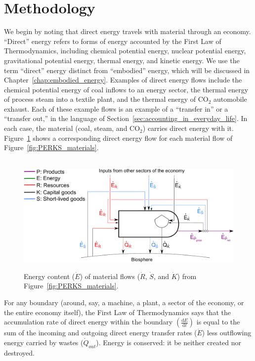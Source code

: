 \section{Methodology}
\label{sec:energy_methodology}

We begin by noting that direct energy travels 
with material through an economy.
``Direct'' energy refers to forms of energy accounted by the 
First Law of Thermodynamics,
including chemical potential energy, 
nuclear potential energy, 
gravitational potential energy,
thermal energy, 
and kinetic energy.
We use the term ``direct'' energy distinct from ``embodied'' energy, 
which will be discussed in Chapter~\ref{chap:embodied_energy}.
Examples of direct energy flows include 
the chemical potential energy of coal inflows to an energy sector, 
the thermal energy of process steam into a textile plant, and
the thermal energy of CO$_2$ automobile exhaust.
Each of these example flows is an example of a ``transfer in''
or a ``transfer out,'' in the language %
of Section~\ref{sec:accounting_in_everyday_life}.
In each case, the material (coal, steam, and CO$_2$) 
carries direct energy with it.
Figure~\ref{fig:PERKS_energy_content} shows a corresponding 
direct energy flow for each material flow of Figure~\ref{fig:PERKS_materials}.

\begin{figure}[!ht]
\centering\
\includegraphics[width=0.8\linewidth]{Part_1/Chapter_Energy/images/PERKS_basic_unit_energy_content.pdf}
\caption[Energy content of material flows for a single sector]{Energy content ($\dot{E}$) of material flows 
($\dot{R}$, $\dot{S}$, and $\dot{K}$) 
from Figure~\ref{fig:PERKS_materials}.}
\label{fig:PERKS_energy_content}
\end{figure}

For any boundary (around, say, a machine, a plant,
a sector of the economy, or the entire economy itself), 
the First Law of Thermodynamics says that 
the accumulation rate 
of direct energy within the 
boundary $\left( \frac{\mathrm{d}E}{\mathrm{d}t} \right)$
is equal to the sum of the incoming and outgoing direct energy transfer 
rates ($\dot{E}$)
less outflowing energy carried by wastes 
($\dot{Q}_{out}$). 
Energy is conserved: it be neither created nor destroyed.

